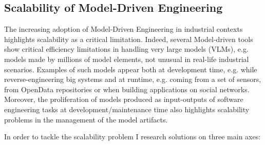 \subsection*{Scalability of Model-Driven Engineering}
The increasing adoption of Model-Driven Engineering in industrial contexts highlights scalability as a critical limitation. Indeed, several Model-driven tools show critical efficiency limitations in handling very large models (VLMs), e.g. models made by millions of model elements, not unusual in real-life industrial scenarios. Examples of such models appear both at development time, e.g. while reverse-engineering big systems and at runtime, e.g. coming from a set of sensors, from OpenData repositories or when building applications on social networks. Moreover, the proliferation of models produced as input-outputs of software engineering tasks at development/maintenance time also highlights scalability problems in the management of the model artifacts.

In order to tackle the scalability problem I research solutions on three main axes:


